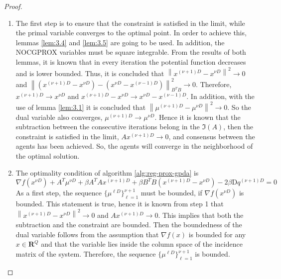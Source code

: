     \newpage
    \begin{proof}
        \hspace{5.0mm}
        \begin{enumerate}
            \item The first step is to ensure that the constraint is satisfied in the limit, while the primal variable converges to the optimal point. In order to achieve this, lemmas \ref{lem:3.4} and \ref{lem:3.5} are going to be used. In addition, the NOCGPROX variables must be square integrable. From the results of both lemmas, it is known that in every iteration the potential function decreases and is lower bounded. Thus, it is concluded that $\left \lVert x^{(\nu + 1)D} - x^{\nu D} \right \rVert ^2 \to 0$ and $\left \lVert \left(x^{(\nu + 1)D} -x^{\nu D}\right) - \left( x^{\nu D} - x^{(\nu - 1)D} \right)  \right \rVert^2_{B^TB} \to 0$. Therefore, $x^{(\nu + 1)D} \to x^{\nu D}$ and $x^{(\nu + 1)D} - x^{\nu D} \to x^{\nu D} - x^{(\nu - 1)D}$. In addition, with the use of lemma \ref{lem:3.1} it is concluded that $\left \lVert \mu^{(\nu + 1)D} - \mu^{\nu D} \right \rVert^2 \to 0$. So the dual variable also converges, $\mu^{(\nu + 1)D} \to \mu^{\nu D}$. Hence it is known that the subtraction between the consecutive iterations belong in the $\Im(A)$, then the constraint is satisfied in the limit, $Ax^{(\nu + 1)D} \to 0$, and consensus between the agents has been achieved. So, the agents will converge in the neighborhood of the optimal solution.
            
            \item The optimality condition of algorithm \ref{alg:reg-prox-gpda} is
            \begin{equation*}
                \nabla f(x^{\nu D}) + A^T\mu^{\nu D} + \beta A^TAx^{(\nu + 1)D} + \beta B^TB(x^{(\nu + 1)D} -x^{\nu D}) -2\beta\mathrm{D}q^{(\nu + 1)D} = 0
            \end{equation*}
            As a first step, the sequence $\{\mu^{\ell D}\}_{\ell = 1}^{\nu + 1}$ must be bounded, if $\nabla f(x^{\nu D})$ is bounded. This statement is true, hence it is known from step 1 that $\left \lVert x^{(\nu + 1)D} - x^{\nu D} \right \rVert^2 \to 0$ and $Ax^{(\nu + 1)D} \to 0$. This implies that both the subtraction and the constraint are bounded. Then the boundedness of the dual variable follows from the assumption that $\nabla f(x)$ is bounded for any $x \in \mathbf{R}^Q$ and that the variable lies inside the column space of the incidence matrix of the system. Therefore, the sequence $\{\mu^{\ell D}\}_{\ell = 1}^{\nu + 1}$ is bounded.
            

\end{enumerate}
\end{proof}
